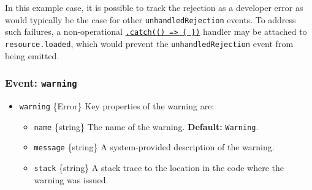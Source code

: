 \begin{Shaded}
\begin{Highlighting}[]
  \OperatorTok{=} \NormalTok{(}\NormalTok{)}\OperatorTok{;}

 \NormalTok{() \{}
   \OperatorTok{=} \NormalTok{(} \NormalTok{(}\NormalTok{))}\OperatorTok{;}
\NormalTok{\}}

\OperatorTok{=}  \NormalTok{()}\OperatorTok{;}
\end{Highlighting}
\end{Shaded}

In this example case, it is possible to track the rejection as a
developer error as would typically be the case for other
\texttt{\textquotesingle{}unhandledRejection\textquotesingle{}} events.
To address such failures, a non-operational
\href{https://developer.mozilla.org/en-US/docs/Web/JavaScript/Reference/Global_Objects/Promise/catch}{\texttt{.catch(()\ =\textgreater{}\ \{\ \})}}
handler may be attached to \texttt{resource.loaded}, which would prevent
the \texttt{\textquotesingle{}unhandledRejection\textquotesingle{}}
event from being emitted.

\subsubsection{\texorpdfstring{Event:
\texttt{\textquotesingle{}warning\textquotesingle{}}}{Event: \textquotesingle warning\textquotesingle{}}}\label{event-warning}

\begin{itemize}
\tightlist
\item
  \texttt{warning} \{Error\} Key properties of the warning are:

  \begin{itemize}
  \tightlist
  \item
    \texttt{name} \{string\} The name of the warning. \textbf{Default:}
    \texttt{\textquotesingle{}Warning\textquotesingle{}}.
  \item
    \texttt{message} \{string\} A system-provided description of the
    warning.
  \item
    \texttt{stack} \{string\} A stack trace to the location in the code
    where the warning was issued.
  \end{itemize}
\end{itemize}

